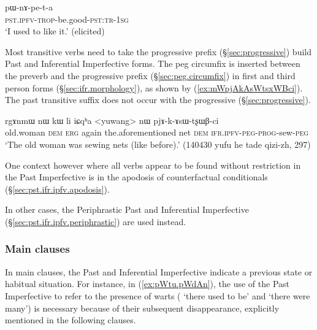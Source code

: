 \begin{exe}
\ex \label{ex:pWnApeta}
\gll pɯ-nɤ-pe-t-a \\
\textsc{pst}.\textsc{ipfv}-\textsc{trop}-be.good-\textsc{pst}:\textsc{tr}-\textsc{1sg} \\
\glt `I used to like it.' (elicited)
\end{exe}


Most transitive verbs need to take the progressive  prefix (§\ref{sec:progressive}) build Past and Inferential Imperfective forms. The peg circumfix  is inserted between the  preverb and the progressive prefix (§\ref{sec:peg.circumfix}) in first and third person forms (§\ref{sec:ifr.morphology}), as shown by (\ref{ex:mWpjAkAsWtsxWBci}). The past transitive suffix  does not occur with the progressive (§\ref{sec:progressive}).

\begin{exe}
\ex \label{ex:mWpjAkAsWtsxWBci}
\gll  rgɤnmɯ nɯ kɯ li iɕqʰa <yuwang> nɯ pjɤ-k-ɤsɯ-tʂɯβ-ci \\
old.woman \textsc{dem} \textsc{erg} again the.aforementioned net \textsc{dem} \textsc{ifr}.\textsc{ipfv}-\textsc{peg}-\textsc{prog}-sew-\textsc{peg} \\
\glt `The old woman was sewing nets (like before).' (140430 yufu he tade qizi-zh, 297)
\end{exe}

One context however where all verbs appear to be found without restriction in the Past Imperfective is in the apodosis of counterfactual conditionals (§\ref{sec:pst.ifr.ipfv.apodosis}).

In other cases, the Periphrastic Past and Inferential Imperfective (§\ref{sec:pst.ifr.ipfv.periphrastic}) are used instead.
 
\subsubsection{Main clauses} \label{sec:pst.ifr.ipfv.main}
In main clauses, the Past and Inferential Imperfective indicate a previous state or habitual situation. For instance, in (\ref{ex:pWtu.pWdAn}), the use of the Past Imperfective to refer to the presence of warts ( `there used to be' and  `there were many') is necessary because of their subsequent disappearance, explicitly mentioned in the following clauses.

